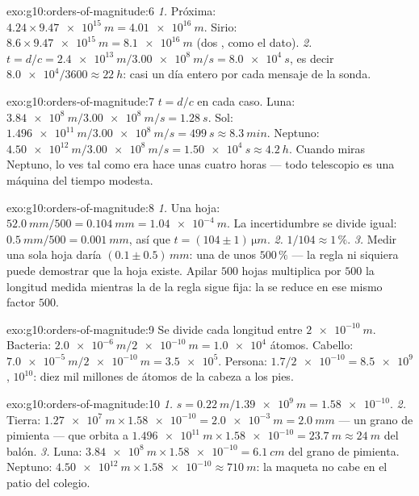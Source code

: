 \begin{solution}{exo:g10:orders-of-magnitude:6}
\emph{1.} Próxima:
$4.24 \times \qty{9.47e15}{m} = \qty{4.01e16}{m}$. Sirio:
$8.6 \times \qty{9.47e15}{m} = \qty{8.1e16}{m}$ (dos , como el dato).
\emph{2.} $t = d/c = \qty{2.4e13}{m} / \qty{3.00e8}{m/s}
= \qty{8.0e4}{s}$, es decir $\num{8.0e4}/3600 \approx \qty{22}{h}$:
casi un día entero por cada mensaje de la sonda.
\end{solution}

\begin{solution}{exo:g10:orders-of-magnitude:7}
$t = d/c$ en cada caso. Luna:
$\qty{3.84e8}{m}/\qty{3.00e8}{m/s} = \qty{1.28}{s}$. Sol:
$\qty{1.496e11}{m}/\qty{3.00e8}{m/s} = \qty{499}{s} \approx
\qty{8.3}{min}$. Neptuno:
$\qty{4.50e12}{m}/\qty{3.00e8}{m/s} = \qty{1.50e4}{s} \approx
\qty{4.2}{h}$. Cuando miras Neptuno, lo ves tal como era hace unas
cuatro horas --- todo telescopio es una máquina del tiempo modesta.
\end{solution}

\begin{solution}{exo:g10:orders-of-magnitude:8}
\emph{1.} Una hoja: $\qty{52.0}{mm}/500 = \qty{0.104}{mm}
= \qty{1.04e-4}{m}$. La incertidumbre se divide igual:
$\qty{0.5}{mm}/500 = \qty{0.001}{mm}$, así que
$t = (104 \pm 1)\,\unit{\micro m}$.
\emph{2.} $1/104 \approx 1\,\%$.
\emph{3.} Medir una sola hoja daría $(0.1 \pm 0.5)\,\unit{mm}$: una
 de unos $500\,\%$ --- la regla ni siquiera puede
demostrar que la hoja existe. Apilar $500$ hojas multiplica por $500$ la
longitud medida mientras la  de la regla sigue
fija: la  se reduce en ese mismo factor $500$.
\end{solution}

\begin{solution}{exo:g10:orders-of-magnitude:9}
Se divide cada longitud entre $\qty{2e-10}{m}$. Bacteria:
$\qty{2.0e-6}{m}/\qty{2e-10}{m} = \num{1.0e4}$ átomos. Cabello:
$\qty{7.0e-5}{m}/\qty{2e-10}{m} = \num{3.5e5}$. Persona:
$1.7/\num{2e-10} = \num{8.5e9}$,  $10^{10}$: diez mil
millones de átomos de la cabeza a los pies.
\end{solution}

\begin{solution}{exo:g10:orders-of-magnitude:10}
\emph{1.} $s = \qty{0.22}{m}/\qty{1.39e9}{m} = \num{1.58e-10}$.
\emph{2.} Tierra:
$\qty{1.27e7}{m} \times \num{1.58e-10} = \qty{2.0e-3}{m} =
\qty{2.0}{mm}$ --- un grano de pimienta --- que orbita a
$\qty{1.496e11}{m} \times \num{1.58e-10} = \qty{23.7}{m} \approx
\qty{24}{m}$ del balón.
\emph{3.} Luna:
$\qty{3.84e8}{m} \times \num{1.58e-10} = \qty{6.1}{cm}$ del grano de
pimienta. Neptuno:
$\qty{4.50e12}{m} \times \num{1.58e-10} \approx \qty{710}{m}$: la
maqueta no cabe en el patio del colegio.
\end{solution}


